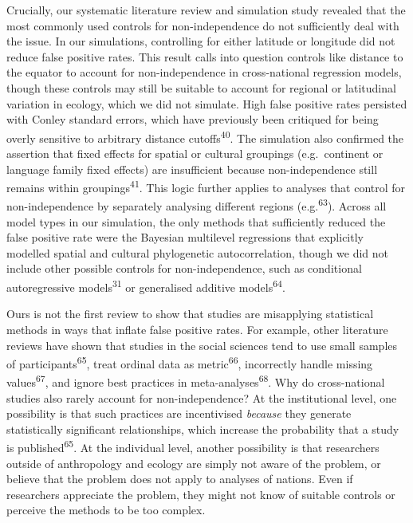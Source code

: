 \documentclass[
  man,floatsintext]{apa6}
\begin{document}
Crucially, our systematic literature review and simulation study revealed that the most commonly used controls for non-independence do not sufficiently deal with the issue. In our simulations, controlling for either latitude or longitude did not reduce false positive rates. This result calls into question controls like distance to the equator to account for non-independence in cross-national regression models, though these controls may still be suitable to account for regional or latitudinal variation in ecology, which we did not simulate. High false positive rates persisted with Conley standard errors, which have previously been critiqued for being overly sensitive to arbitrary distance cutoffs\textsuperscript{40}. The simulation also confirmed the assertion that fixed effects for spatial or cultural groupings (e.g.~continent or language family fixed effects) are insufficient because non-independence still remains within groupings\textsuperscript{41}. This logic further applies to analyses that control for non-independence by separately analysing different regions (e.g.\textsuperscript{63}). Across all model types in our simulation, the only methods that sufficiently reduced the false positive rate were the Bayesian multilevel regressions that explicitly modelled spatial and cultural phylogenetic autocorrelation, though we did not include other possible controls for non-independence, such as conditional autoregressive models\textsuperscript{31} or generalised additive models\textsuperscript{64}.

Ours is not the first review to show that studies are misapplying statistical methods in ways that inflate false positive rates. For example, other literature reviews have shown that studies in the social sciences tend to use small samples of participants\textsuperscript{65}, treat ordinal data as metric\textsuperscript{66}, incorrectly handle missing values\textsuperscript{67}, and ignore best practices in meta-analyses\textsuperscript{68}. Why do cross-national studies also rarely account for non-independence? At the institutional level, one possibility is that such practices are incentivised \emph{because} they generate statistically significant relationships, which increase the probability that a study is published\textsuperscript{65}. At the individual level, another possibility is that researchers outside of anthropology and ecology are simply not aware of the problem, or believe that the problem does not apply to analyses of nations. Even if researchers appreciate the problem, they might not know of suitable controls or perceive the methods to be too complex.
\end{document}
